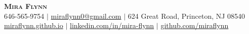 \documentclass[a4paper,10pt]{article}
\begin{document}


\begin{center}
    \textbf{\Huge \scshape Mira Flynn} \\ \vspace{0pt}
    \small 646-565-9754 $|$
    \href{mailto:miraflynn0@gmail.com}{miraflynn0@gmail.com} $|$
    624 Great Road, Princeton, NJ 08540 \\
    \href{https://miraflynn.github.io/}{miraflynn.github.io} $|$
    \href{https://www.linkedin.com/in/mira-flynn/}{linkedin.com/in/mira-flynn} $|$
    \href{https://github.com/miraflynn}{github.com/miraflynn}
\end{center}
\vspace{-16pt}


\end{document}
